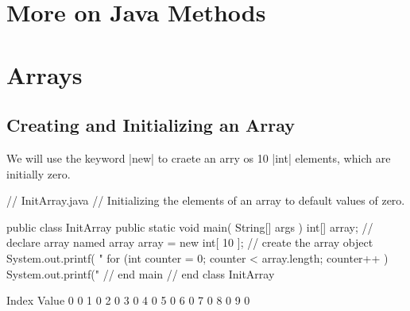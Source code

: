 \chapter{More on Java Methods}


\chapter{Arrays}

\section{Creating and Initializing an Array}

We will use the keyword |new| to craete an arry os 10 |int| elements,
which are initially zero.

\begin{javacode}
// InitArray.java
// Initializing the elements of an array to default values of zero.

public class InitArray
{
    public static void main( String[] args )
    {
		int[] array; // declare array named array
		array = new int[ 10 ]; // create the array object
		System.out.printf( "%
   		for (int counter = 0; counter < array.length; counter++  )
   		System.out.printf("%
    } // end main
} // end class InitArray
\end{javacode}

\begin{bashcode}
Index   Value
    0       0
    1       0
    2       0
    3       0
    4       0
    5       0
    6       0
    7       0
    8       0
    9       0
\end{bashcode}    
